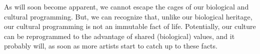 \documentclass{article}
\begin{document}
As will soon become apparent, we cannot escape the cages of our biological and
cultural programming. But, we can recognize that, unlike our biological
heritage, our cultural programming is not an immutable fact of life.
Potentially, our culture can be reprogrammed to the advantage of shared
(biological) values, and it probably will, as soon as more artists start to
catch up to these facts.



\end{document}
